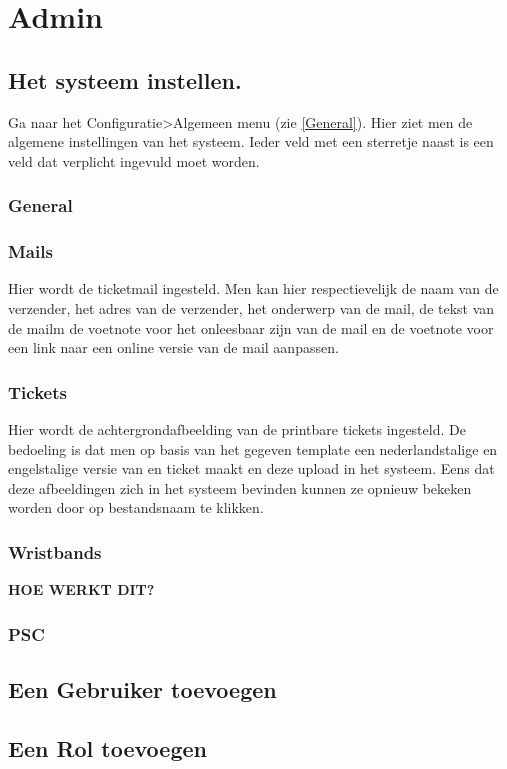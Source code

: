 \documentclass[]{memoir}
\begin{document}
\section{Admin} \label{AdminInstr}
\subsection{Het systeem instellen.} \label{SetSystem}
Ga naar het Configuratie>Algemeen menu (zie \ref{General}). Hier ziet men de algemene instellingen van het systeem. Ieder veld met een sterretje naast is een veld dat verplicht ingevuld moet worden.
\subsubsection{General}
\subsubsection{Mails}
Hier wordt de ticketmail ingesteld. Men kan hier respectievelijk de naam van de verzender, het adres van de verzender, het onderwerp van de mail, de tekst van de mailm de voetnote voor het onleesbaar zijn van de mail en de voetnote voor een link naar een online versie van de mail aanpassen.
\subsubsection{Tickets}
Hier wordt de achtergrondafbeelding van de printbare tickets ingesteld. De bedoeling is dat men op basis van het gegeven template een nederlandstalige en engelstalige versie van en ticket maakt en deze upload in het systeem. Eens dat deze afbeeldingen zich in het systeem bevinden kunnen ze opnieuw bekeken worden door op bestandsnaam te klikken.
\subsubsection{Wristbands}
\textbf{HOE WERKT DIT?}
\subsubsection{PSC}
\subsection{Een Gebruiker toevoegen} \label{AddUser}
\subsection{Een Rol toevoegen} \label{SetRole}
\end{document}
